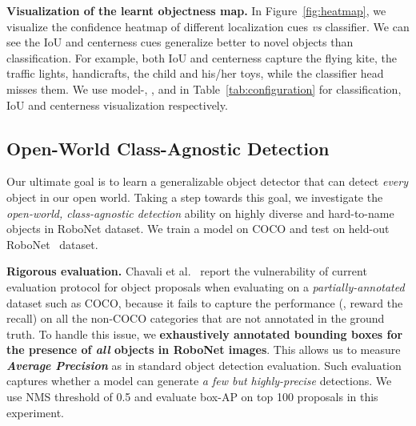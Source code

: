 \documentclass[10pt,twocolumn,letterpaper]{article}
\newcommand{\figureref}[1]{Figure~\ref{#1}}
\newcommand{\tableref}[1]{Table~\ref{#1}}
\renewcommand{\paragraph}[1]{\vspace{1mm}\noindent\textbf{#1}}
\begin{document}
\paragraph{{Visualization of the learnt objectness map.}}\quad
In \figureref{fig:heatmap}, we visualize the confidence heatmap of different localization cues \textit{vs} classifier. We can see the IoU and centerness cues generalize better to novel objects than classification. For example, both IoU and centerness capture the flying kite, the traffic lights, handicrafts, the child and his/her toys, while the classifier head misses them. We use model-, , and  in \tableref{tab:configuration} for classification, IoU and centerness visualization respectively.


\subsection{Open-World Class-Agnostic Detection}
\label{sec:robonet_detection}
Our ultimate goal is to learn a generalizable object detector that can detect \textit{every} object in our open world. Taking a step towards this goal, we investigate the \textit{open-world, class-agnostic detection} ability on highly diverse and hard-to-name objects in RoboNet dataset. We train a model on COCO and test on held-out RoboNet~\cite{dasari2019robonet} dataset.


\paragraph{Rigorous evaluation.} \quad
Chavali et al.~\cite{chavali2016object} report the vulnerability of current evaluation protocol for object proposals when evaluating on a \textit{partially-annotated} dataset such as COCO, because it fails to capture the performance (\eg, reward the recall) on all the non-COCO categories that are not annotated in the ground truth. To handle this issue, we \textbf{exhaustively annotated bounding boxes for the presence of \textit{all} objects in RoboNet images}. This allows us to measure \textit{\textbf{Average Precision}} as in standard object detection evaluation. Such evaluation captures whether a model can generate \textit{a few but highly-precise} detections. We use NMS threshold of 0.5 and evaluate box-AP on top 100 proposals in this experiment. 
\end{document}
